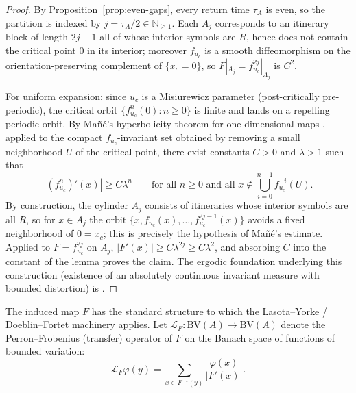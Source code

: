 \begin{proof}
By Proposition~\ref{prop:even-gaps}, every return time $\tau_A$ is even,
so the partition is indexed by $j = \tau_A / 2 \in \mathbb{N}_{\geq 1}$.
Each $A_j$ corresponds to an itinerary block of length $2j - 1$ all of
whose interior symbols are $R$, hence does not contain the critical
point $0$ in its interior; moreover $f_{u_c}$ is a smooth diffeomorphism
on the orientation-preserving complement of $\{x_c = 0\}$, so
$F|_{A_j} = f_{u_c}^{2j}|_{A_j}$ is $C^2$.

For uniform expansion: since $u_c$ is a Misiurewicz parameter
(post-critically pre-periodic), the critical orbit $\{f_{u_c}^n(0) : n \geq 0\}$
is finite and lands on a repelling periodic orbit. By Ma\~n\'e's
hyperbolicity theorem for one-dimensional maps
\cite[Theorem~A]{mane1985hyperbolicity}, applied to the compact
$f_{u_c}$-invariant set obtained by removing a small neighborhood
$U$ of the critical point, there exist constants $C > 0$ and
$\lambda > 1$ such that
\[
    |(f_{u_c}^n)'(x)| \geq C \lambda^n
    \qquad \text{for all } n \geq 0
    \text{ and all } x \notin \bigcup_{i=0}^{n-1} f_{u_c}^{-i}(U).
\]
By construction, the cylinder $A_j$ consists of itineraries whose
interior symbols are all $R$, so for $x \in A_j$ the orbit
$\{x, f_{u_c}(x), \ldots, f_{u_c}^{2j-1}(x)\}$ avoids a fixed
neighborhood of $0 = x_c$; this is precisely the hypothesis of Ma\~n\'e's
estimate. Applied to $F = f_{u_c}^{2j}$ on $A_j$,
$|F'(x)| \geq C \lambda^{2j} \geq C \lambda^2$, and absorbing $C$
into the constant of the lemma proves the claim. The ergodic
foundation underlying this construction (existence of an absolutely
continuous invariant measure with bounded distortion) is
\cite[Theorem~1]{misiurewicz1981absolutely}.
\end{proof}

The induced map $F$ has the standard structure to which the
Lasota--Yorke / Doeblin--Fortet machinery applies. Let
$\mathcal{L}_F : \mathrm{BV}(A) \to \mathrm{BV}(A)$ denote the
Perron--Frobenius (transfer) operator of $F$ on the Banach space of
functions of bounded variation:
\[
    \mathcal{L}_F \varphi (y) = \sum_{x \in F^{-1}(y)} \frac{\varphi(x)}{|F'(x)|}.
\]

